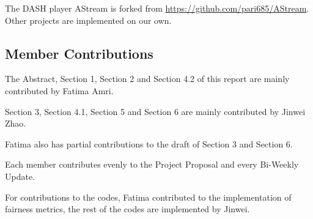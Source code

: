 \documentclass[12pt]{article}
\begin{document}
The DASH player AStream is forked from \url{https://github.com/pari685/AStream}. Other projects are implemented on our own.


\subsection{Member Contributions}
The Abstract, Section 1, Section 2 and Section 4.2 of this report are mainly contributed by Fatima Amri. 

Section 3, Section 4.1, Section 5 and Section 6 are mainly contributed by Jinwei Zhao. 

Fatima also has partial contributions to the draft of Section 3 and Section 6. 

Each member contributes evenly to the Project Proposal and every Bi-Weekly Update.

For contributions to the codes, Fatima contributed to the implementation of fairness metrics, the rest of the codes are implemented by Jinwei.
\end{document}
